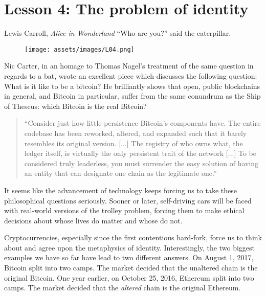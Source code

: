 \chapter{Lesson 4: The problem of identity}
\label{les:4}

\begin{chapquote}{Lewis Carroll, \textit{Alice in Wonderland}}
  ``Who are you?'' said the caterpillar.
\end{chapquote}

\begin{figure}
  \texttt{[image: assets/images/L04.png]}
  \label{fig:caterpillar}
\end{figure}

Nic Carter, in an homage to Thomas Nagel's treatment of the same
question in regards to a bat, wrote an excellent piece which discusses
the following question: What is it like to be a bitcoin? He
brilliantly shows that open, public blockchains in general, and Bitcoin
in particular, suffer from the same conundrum as the Ship of
Theseus: which Bitcoin is the real Bitcoin?

\begin{quotation}
``Consider just how little persistence Bitcoin's components have. The
entire codebase has been reworked, altered, and expanded such that it
barely resembles its original version. [...] The registry of who
owns what, the ledger itself, is virtually the only persistent trait
of the network [...]
To be considered truly leaderless, you must surrender the easy
solution of having an entity that can designate one chain as the
legitimate one.''
\end{quotation}

It seems like the advancement of technology keeps forcing us to take
these philosophical questions seriously. Sooner or later, self-driving
cars will be faced with real-world versions of the trolley problem,
forcing them to make ethical decisions about whose lives do matter and
whose do not.

Cryptocurrencies, especially since the first contentious hard-fork,
force us to think about and agree upon the metaphysics of identity.
Interestingly, the two biggest examples we have so far have lead to two
different answers. On August 1, 2017, Bitcoin split into two camps. The
market decided that the unaltered chain is the original Bitcoin. One
year earlier, on October 25, 2016, Ethereum split into two camps. The
market decided that the \textit{altered} chain is the original Ethereum.

